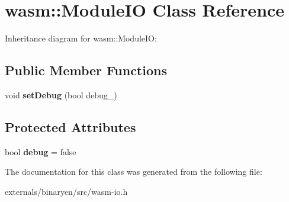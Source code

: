 \hypertarget{classwasm_1_1_module_i_o}{}\section{wasm\+:\+:Module\+IO Class Reference}
\label{classwasm_1_1_module_i_o}


Inheritance diagram for wasm\+:\+:Module\+IO\+:
\subsection*{Public Member Functions}
\begin{DoxyCompactItemize}
\item 
\mbox{\label{classwasm_1_1_module_i_o_acba182bfb13fce237a024767677cfa6a}} 
void {\bfseries set\+Debug} (bool debug\+\_\+)
\end{DoxyCompactItemize}
\subsection*{Protected Attributes}
\begin{DoxyCompactItemize}
\item 
\mbox{\label{classwasm_1_1_module_i_o_ae3734917b78ab129e5efcdcdcbac5cc8}} 
bool {\bfseries debug} = false
\end{DoxyCompactItemize}


The documentation for this class was generated from the following file\+:\begin{DoxyCompactItemize}
\item 
externals/binaryen/src/wasm-\/io.\+h\end{DoxyCompactItemize}

